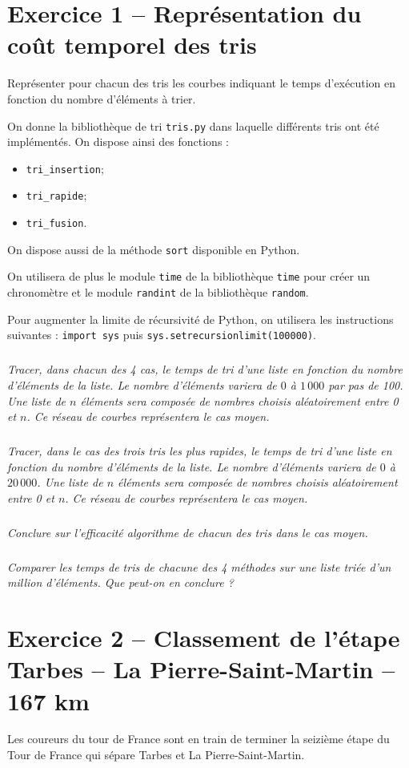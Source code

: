 \section*{Exercice 1 -- Représentation du coût temporel des tris}

\begin{obj}
Représenter pour chacun des tris les courbes indiquant le temps d'exécution en fonction du nombre d'éléments à trier.
\end{obj}
On donne la bibliothèque de tri \texttt{tris.py} dans laquelle différents tris ont été implémentés.
On dispose ainsi des fonctions : 
\begin{itemize}
\item \texttt{tri\_insertion};
\item \texttt{tri\_rapide};
\item \texttt{tri\_fusion}.
\end{itemize}
On dispose aussi de la méthode \texttt{sort} disponible en Python.

On utilisera de plus le module \texttt{time} de la bibliothèque \texttt{time} pour créer un chronomètre et le module \texttt{randint} de la bibliothèque \texttt{random}.

Pour augmenter la limite de récursivité de Python, on utilisera les instructions suivantes : \texttt{import sys} puis \texttt{sys.setrecursionlimit(100000)}.

\subparagraph{}
\textit{Tracer, dans chacun des 4 cas, le temps de tri d'une liste en fonction du nombre d'éléments de la liste. Le nombre d'éléments variera de $0$ à $1\, 000$ par pas de 100. Une liste de $n$ éléments sera composée de nombres choisis aléatoirement entre 0 et $n$. Ce réseau de courbes représentera le cas moyen.}

\subparagraph{}
\textit{Tracer, dans le cas des trois tris les plus rapides, le temps de tri d'une liste en fonction du nombre d'éléments de la liste. Le nombre d'éléments variera de $0$ à $20\, 000$. Une liste de $n$ éléments sera composée de nombres choisis aléatoirement entre 0 et $n$. Ce réseau de courbes représentera le cas moyen.}

\subparagraph{}
\textit{Conclure sur l'efficacité algorithme de chacun des tris dans le cas moyen.}

\subparagraph{}
\textit{Comparer les temps de tris de chacune des 4 méthodes sur une liste triée d'un million d'éléments. Que peut-on en conclure ?}




\section*{Exercice 2 -- Classement de l'étape Tarbes -- La Pierre-Saint-Martin -- 167 km}
Les coureurs du tour de France sont en train de terminer la seizième étape du Tour de France qui sépare Tarbes et La Pierre-Saint-Martin. 

